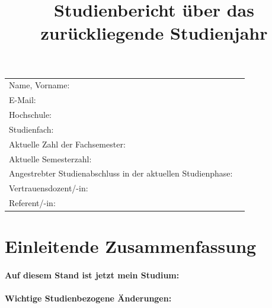 \documentclass[]{scrartcl}
\title{Studienbericht über das zurückliegende Studienjahr}
\date{}
\begin{document}
\maketitle

\begin{tabular}{p{}p{}}
    Name, Vorname: & \\
    E-Mail: & \texttt{} \\
    Hochschule: & \\
    Studienfach: & \\
    Aktuelle Zahl der Fachsemester: & \\
    Aktuelle Semesterzahl: & \\ %
    Angestrebter Studienabschluss in der aktuellen Studienphase: & \\ %
    Vertrauensdozent/-in: & \\
    Referent/-in: & \\
\end{tabular}


\section*{Einleitende Zusammenfassung}

\paragraph{Auf diesem Stand ist jetzt mein Studium:}

\paragraph{Wichtige Studienbezogene Änderungen:}
%
\end{document}
